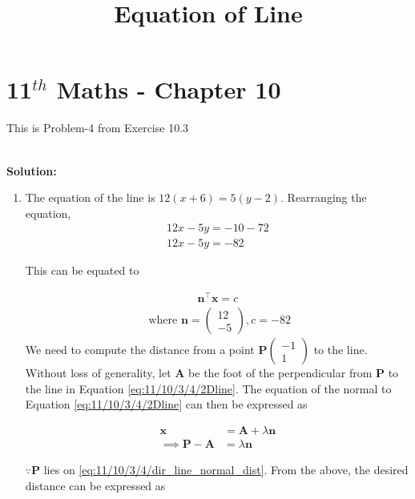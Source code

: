 \documentclass[12pt]{article}
\providecommand{\brak}[1]{\ensuremath{\left(#1\right)}}
\newcommand{\solution}{\noindent \textbf{Solution: }}
\newcommand{\myvec}[1]{\ensuremath{\begin{pmatrix}#1\end{pmatrix}}}
\let\vec\mathbf
\begin{document}
\begin{center}
\title{\textbf{Equation  of Line}}
\date{\vspace{-5ex}} %
\maketitle
\end{center}
\setcounter{page}{1}

\section{11$^{th}$ Maths - Chapter 10}
This is Problem-4 from Exercise 10.3
\begin{enumerate}
		\fi
	\\
\solution 
\begin{enumerate}
\item The equation of the line is $12\brak{x+6} = 5\brak{y-2}$. Rearranging the equation, 
\begin{align}
12x-5y = -10-72 \\
12x-5y = -82
\end{align}

This can be equated to

\begin{align}
	\label{eq:11/10/3/4/2Dline}
	\vec{n}^\top\vec{x} = c 
\end{align}
\begin{align}
	\text{ where }
		\vec{n} = \myvec{
	  12 \\
	  -5 
	  } ,   c = -82 
\end{align}
		We need to compute the distance from a point $\vec{P}\myvec{-1 \\ 1}$ to the line. 
Without loss of generality, let $\vec{A}$ be the foot of the perpendicular from $\vec{P}$ to the line in Equation \eqref{eq:11/10/3/4/2Dline}. 
The equation of the normal to Equation \eqref{eq:11/10/3/4/2Dline} can then be expressed as 

\begin{align}
	\label{eq:11/10/3/4/dir_line_normal_dist}
	\vec{x} &= \vec{A} + \lambda \vec{n}
	\\
	\implies 
	\label{eq:11/10/3/4/dir_line_normal_dist_pa}
	\vec{P}- \vec{A} &=  \lambda \vec{n}
\end{align}

$\because \vec{P}$ lies on 
		\eqref{eq:11/10/3/4/dir_line_normal_dist}.
From the above, the desired distance can be expressed as 


\end{enumerate}
\end{enumerate}
\end{document}
